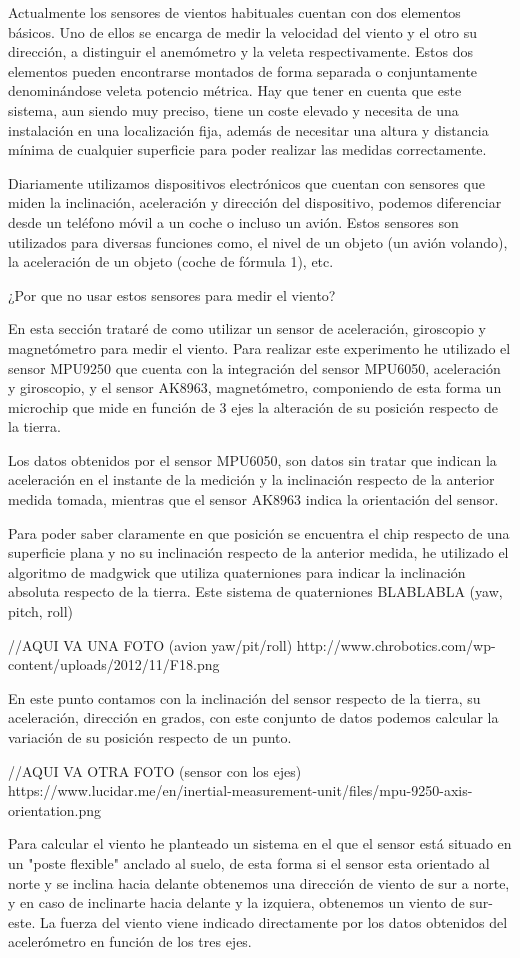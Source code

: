 
 Actualmente los sensores de vientos habituales cuentan con dos elementos básicos. Uno de ellos se encarga de medir la velocidad del viento y el otro su dirección, a distinguir el anemómetro y la veleta respectivamente. Estos dos elementos pueden encontrarse montados de forma separada o conjuntamente denominándose veleta potencio métrica.
 Hay que tener en cuenta que este sistema, aun siendo muy preciso, tiene un coste elevado y necesita de una instalación en una localización fija, además de necesitar una altura y distancia mínima de cualquier superficie para poder realizar las medidas correctamente.
 
 Diariamente utilizamos dispositivos electrónicos que cuentan con sensores que miden la inclinación, aceleración y dirección del dispositivo, podemos diferenciar desde un teléfono móvil a un coche o incluso un avión.
 Estos sensores son utilizados para diversas funciones como, el nivel de un objeto (un avión volando), la aceleración de un objeto (coche de fórmula 1), etc.
 
 ¿Por que no usar estos sensores para medir el viento?
 
 En esta sección trataré de como utilizar un sensor de aceleración, giroscopio y magnetómetro para medir el viento.
 Para realizar este experimento he utilizado el sensor MPU9250 que cuenta con la integración del sensor MPU6050, aceleración y giroscopio, y el sensor AK8963, magnetómetro, componiendo de esta forma un microchip que mide en función de 3 ejes la alteración de su posición respecto de la tierra.
 
 Los datos obtenidos por el sensor MPU6050, son datos sin tratar que indican la aceleración en el instante de la medición y la inclinación respecto de la anterior medida tomada, mientras que el sensor AK8963 indica la orientación del sensor.
 
 Para poder saber claramente en que posición se encuentra el chip respecto de una superficie plana y no su inclinación respecto de la anterior medida, he utilizado el algoritmo de madgwick que utiliza quaterniones para indicar la inclinación absoluta respecto de la tierra. 
 Este sistema de quaterniones BLABLABLA (yaw, pitch, roll)
 
 //AQUI VA UNA FOTO (avion yaw/pit/roll)
 http://www.chrobotics.com/wp-content/uploads/2012/11/F18.png
 
 En este punto contamos con la inclinación del sensor respecto de la tierra, su aceleración, dirección en grados, con este conjunto de datos podemos calcular la variación de su posición respecto de un punto.
 
  //AQUI VA OTRA FOTO (sensor con los ejes)
  https://www.lucidar.me/en/inertial-measurement-unit/files/mpu-9250-axis-orientation.png
  
  Para calcular el viento he planteado un sistema en el que el sensor está situado en un "poste flexible" anclado al suelo, de esta forma si el sensor esta orientado al norte y se inclina hacia delante obtenemos una dirección de viento de sur a norte, y en caso de inclinarte hacia delante y la izquiera, obtenemos un viento de sur-este. La fuerza del viento viene indicado directamente por los datos obtenidos del acelerómetro en función de los tres ejes.
  
  